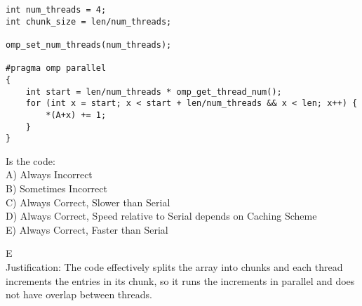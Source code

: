 \begin{blocksection}

\question
\begin{verbatim}
int num_threads = 4;
int chunk_size = len/num_threads;

omp_set_num_threads(num_threads);

#pragma omp parallel
{
    int start = len/num_threads * omp_get_thread_num();
    for (int x = start; x < start + len/num_threads && x < len; x++) {
        *(A+x) += 1;
    }
} 
\end{verbatim}

Is the code: \\
A) Always Incorrect \\
B) Sometimes Incorrect \\ 
C) Always Correct, Slower than Serial \\
D) Always Correct, Speed relative to Serial depends on Caching Scheme \\
E) Always Correct, Faster than Serial \\

\begin{solution}[0.5in]
E \\
Justification: The code effectively splits the array into chunks and each thread increments the entries in its chunk, so it runs the increments in parallel and does not have overlap between threads. 

\end{solution}
\end{blocksection}